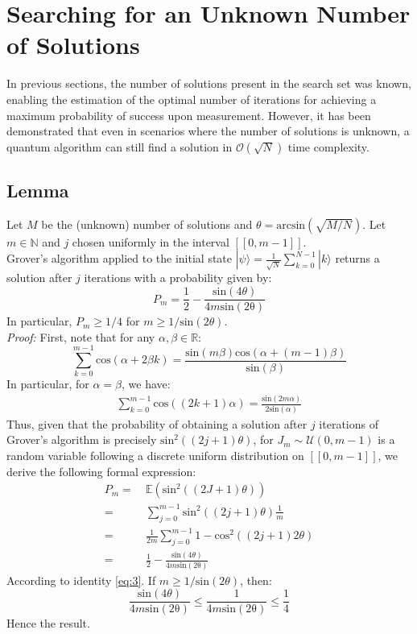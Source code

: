 \section{Searching for an Unknown Number of Solutions}
\label{part3}

In previous sections, the number of solutions present in the search set was known, enabling the estimation of the optimal number of iterations for achieving a maximum probability of success upon measurement. However, it has been demonstrated that even in scenarios where the number of solutions is unknown, a quantum algorithm can still find a solution in $\mathcal{O}(\sqrt{N})$ time complexity. \cite{brassard2002quantum}

\subsection{Lemma}
\label{Lemma}

Let $M$ be the (unknown) number of solutions and $\theta = \mathrm{arcsin}(\sqrt{M/N})$. Let $m \in \mathbb{N}$ and $j$ chosen uniformly in the interval $[\![0, m-1]\!]$.
\\[5pt]
Grover's algorithm applied to the initial state $| \psi \rangle = \frac{1}{\sqrt{N}} \sum_{k=0}^{N-1} |k\rangle$ returns a solution after $j$ iterations with a probability given by:
\[P_m = \frac{1}{2} - \frac{\mathrm{sin}(4\theta)}{4m\mathrm{sin(2\theta)}}\]
In particular, $P_m \geq 1/4$ for $m \geq 1/\mathrm{sin}(2\theta)$.
\\[5pt]
\textit{Proof:} First, note that for any $\alpha, \beta \in \mathbb{R}$:
\[ \sum_{k=0}^{m-1}\mathrm{cos}(\alpha + 2\beta k) = \frac{\mathrm{sin}(m\beta)\mathrm{cos}(\alpha+(m-1)\beta)}{\mathrm{sin}(\beta)}\]
In particular, for $\alpha=\beta$, we have:
\begin{align}
\sum_{k=0}^{m-1}\mathrm{cos}((2k+1)\alpha) = \frac{\mathrm{sin}(2m\alpha)}{2\mathrm{sin}(\alpha)}
\label{eq:3}
\end{align}
Thus, given that the probability of obtaining a solution after $j$ iterations of Grover's algorithm is precisely $\mathrm{sin}^2((2j+1)\theta)$, for $J_m \sim \mathcal{U}(0,m-1)$ is a random variable following a discrete uniform distribution on $[\![0,m-1]\!]$, we derive the following formal expression:
\begin{align*}
P_m =&\ \mathbb{E}(\mathrm{sin}^2((2J+1)\theta)) \\
=&\ \sum_{j=0}^{m-1}\mathrm{sin}^2((2j+1)\theta) \frac{1}{m} \\
=&\ \frac{1}{2m} \sum_{j=0}^{m-1}1 - \mathrm{cos}^2((2j+1)2\theta) \\
=&\ \frac{1}{2} - \frac{\mathrm{sin}(4\theta)}{4m\mathrm{sin(2\theta)}}
\end{align*}
According to identity \eqref{eq:3}. If $m \geq 1/\mathrm{sin}(2\theta)$, then:
\[\frac{\mathrm{sin}(4\theta)}{4m\mathrm{sin(2\theta)}} \leq \frac{1}{4m\mathrm{sin(2\theta)}} \leq \frac{1}{4}\]
Hence the result.

